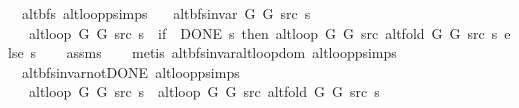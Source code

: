 \begin{isabellebody}
\endisatagproof
{\isafoldproof}%
%
\isadelimproof
\isanewline
%
\endisadelimproof
%
\isadeliminvisible
\isanewline
%
\endisadeliminvisible
%
\isataginvisible
{}\isamarkupfalse%
\ {\isacharparenleft}{\kern0pt}\ alt{\isacharunderscore}{\kern0pt}bfs{\isacharparenright}{\kern0pt}\ alt{\isacharunderscore}{\kern0pt}loop{\isacharunderscore}{\kern0pt}psimps{\isacharcolon}{\kern0pt}\isanewline
\ \ \ {\isachardoublequoteopen}alt{\isacharunderscore}{\kern0pt}bfs{\isacharunderscore}{\kern0pt}invar{\isacharprime}{\kern0pt}\ G{}\ G{}\ src\ s{\isachardoublequoteclose}\isanewline
\ \ \ {\isachardoublequoteopen}alt{\isacharunderscore}{\kern0pt}loop\ G{}\ G{}\ src\ s\ {\isacharequal}{\kern0pt}\ {\isacharparenleft}{\kern0pt}if\ {\isasymnot}\ DONE\ s\ then\ alt{\isacharunderscore}{\kern0pt}loop\ G{}\ G{}\ src\ {\isacharparenleft}{\kern0pt}alt{\isacharunderscore}{\kern0pt}fold\ G{}\ G{}\ src\ s{\isacharparenright}{\kern0pt}\ else\ s{\isacharparenright}{\kern0pt}{\isachardoublequoteclose}%
\endisataginvisible
{\isafoldinvisible}%
%
\isadeliminvisible
\isanewline
%
\endisadeliminvisible
%
\isadelimproof
\ \ %
\endisadelimproof
%
\isatagproof
{}\isamarkupfalse%
\ assms\isanewline
\ \ \isamarkupfalse%
\ {\isacharparenleft}{\kern0pt}metis\ alt{\isacharunderscore}{\kern0pt}bfs{\isacharunderscore}{\kern0pt}invar{\isachardot}{\kern0pt}alt{\isacharunderscore}{\kern0pt}loop{\isacharunderscore}{\kern0pt}dom\ alt{\isacharunderscore}{\kern0pt}loop{\isachardot}{\kern0pt}psimps{\isacharparenright}{\kern0pt}%
\endisatagproof
{\isafoldproof}%
%
\isadelimproof
\isanewline
%
\endisadelimproof
%
\isadeliminvisible
\isanewline
%
\endisadeliminvisible
%
\isataginvisible
{}\isamarkupfalse%
\ {\isacharparenleft}{\kern0pt}\ alt{\isacharunderscore}{\kern0pt}bfs{\isacharunderscore}{\kern0pt}invar{\isacharunderscore}{\kern0pt}not{\isacharunderscore}{\kern0pt}DONE{\isacharparenright}{\kern0pt}\ alt{\isacharunderscore}{\kern0pt}loop{\isacharunderscore}{\kern0pt}psimps{\isacharcolon}{\kern0pt}\isanewline
\ \ \ {\isachardoublequoteopen}alt{\isacharunderscore}{\kern0pt}loop\ G{}\ G{}\ src\ s\ {\isacharequal}{\kern0pt}\ alt{\isacharunderscore}{\kern0pt}loop\ G{}\ G{}\ src\ {\isacharparenleft}{\kern0pt}alt{\isacharunderscore}{\kern0pt}fold\ G{}\ G{}\ src\ s{\isacharparenright}{\kern0pt}{\isachardoublequoteclose}%

\end{isabellebody}
